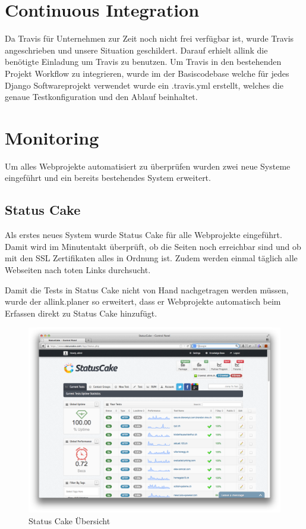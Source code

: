 \section{Continuous Integration}
\label{sec:continuous_integration_proof_of_concept}
Da Travis für Unternehmen zur Zeit noch nicht frei verfügbar ist, wurde Travis angeschrieben und unsere Situation geschildert. Darauf erhielt allink die benötigte Einladung um Travis zu benutzen.
Um Travis in den bestehenden Projekt Workflow zu integrieren, wurde im der Basiscodebase welche für jedes Django Softwareprojekt verwendet wurde ein .travis.yml erstellt, welches die genaue Testkonfiguration und den Ablauf beinhaltet.

\section{Monitoring}
\label{sec:monitoring_proof_of_concept}
Um alles Webprojekte automatisiert zu überprüfen wurden zwei neue Systeme eingeführt und ein bereits bestehendes System erweitert.

\subsection{Status Cake}
\label{sub:status_cake}
Als erstes neues System wurde Status Cake für alle Webprojekte eingeführt. Damit wird im Minutentakt überprüft, ob die Seiten noch erreichbar sind und ob mit den SSL Zertifikaten alles in Ordnung ist. Zudem werden einmal täglich alle Webseiten nach toten Links durchsucht.

Damit die Tests in Status Cake nicht von Hand nachgetragen werden müssen, wurde der allink.planer so erweitert, dass er Webprojekte automatisch beim Erfassen direkt zu Status Cake hinzufügt.

\begin{figure}[ht]
\centering
\includegraphics[width=1\textwidth]{images/status_cake.png}
\caption{Status Cake Übersicht}
\label{fig:status_cake}
\end{figure}



